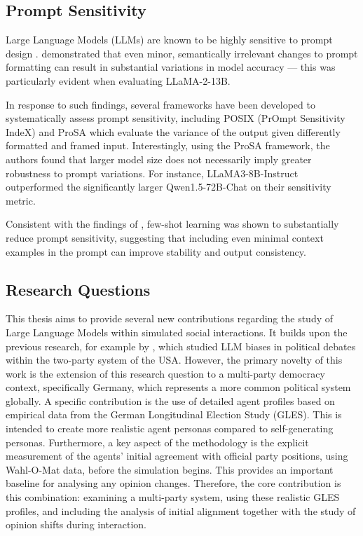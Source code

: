 \documentclass[12pt]{article}
\begin{document}
\begin{multicols}{2}
\subsection{Prompt Sensitivity}

Large Language Models (LLMs) are known to be highly sensitive to prompt design \cite{sclar2023quantifying, gao2020making, jiang2020can}.  demonstrated that even minor, semantically irrelevant changes to prompt formatting can result in substantial variations in model accuracy — this was particularly evident when evaluating LLaMA-2-13B. 

In response to such findings, several frameworks have been developed to systematically assess prompt sensitivity, including POSIX (PrOmpt Sensitivity IndeX) \cite{chatterjee2024posix} and ProSA \cite{zhuo2024prosa} which evaluate the variance of the output given differently formatted and framed input. Interestingly, using the ProSA framework, the authors found that larger model size does not necessarily imply greater robustness to prompt variations. For instance, LLaMA3-8B-Instruct outperformed the significantly larger Qwen1.5-72B-Chat on their sensitivity metric.

Consistent with the findings of , few-shot learning was shown to substantially reduce prompt sensitivity, suggesting that including even minimal context examples in the prompt can improve stability and output consistency.

\subsection{Research Questions}

This thesis aims to provide several new contributions regarding the study of Large Language Models within simulated social interactions. It builds upon the previous research, for example by , which studied LLM biases in political debates within the two-party system of the USA. However, the primary novelty of this work is the extension of this research question to a multi-party democracy context, specifically Germany, which represents a more common political system globally. A specific contribution is the use of detailed agent profiles based on empirical data from the German Longitudinal Election Study (GLES). This is intended to create more realistic agent personas compared to self-generating personas. Furthermore, a key aspect of the methodology is the explicit measurement of the agents' initial agreement with official party positions, using Wahl-O-Mat data, before the simulation begins. This provides an important baseline for analysing any opinion changes. Therefore, the core contribution is this combination: examining a multi-party system, using these realistic GLES profiles, and including the analysis of initial alignment together with the study of opinion shifts during interaction.


\end{multicols}
\end{document}
